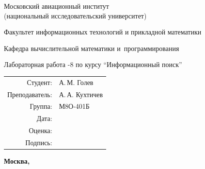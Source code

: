 \begin{titlepage}
\begin{center}
\bfseries

{\Large Московский авиационный институт\\ (национальный исследовательский университет)}

\vspace{48pt}

{\large Факультет информационных технологий и прикладной математики}

\vspace{36pt}

{\large Кафедра вычислительной математики и~программирования}

\vspace{48pt}

Лабораторная работа -8 по курсу \enquote{Информационный поиск}

\end{center}

\vspace{72pt}

\begin{flushright}
\begin{tabular}{rl}
Студент: & А.\,М. Голев \\
Преподаватель: & А.\,А. Кухтичев \\
Группа: & М8О-401Б \\
Дата: & \\
Оценка: & \\
Подпись: & \\
\end{tabular}
\end{flushright}

\vfill

\begin{center}
\bfseries
Москва, \the\year
\end{center}
\end{titlepage}

\pagebreak
